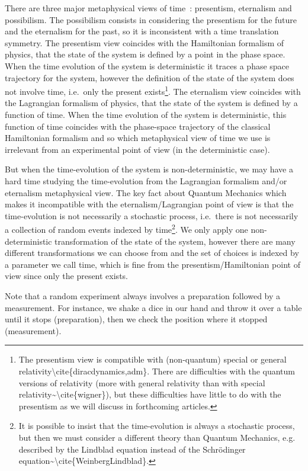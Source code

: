 \documentclass[11pt]{book}
\begin{document}
There are three major metaphysical views of
time~\cite{Savitt2017Being}:
presentism, eternalism and possibilism. The possibilism consists in
considering the presentism for the future and the eternalism for the
past, so it is inconsistent with a time translation symmetry. The
presentism view coincides with the Hamiltonian formalism of physics,
that the state of the system is defined by a point in the phase space.
When the time evolution of the system is deterministic it traces a phase
space trajectory for the system, however the definition of the state of
the system does not involve time, i.e.~only the present
exists\footnote{The presentism view is compatible with (non-quantum)
  special or general relativity\textbackslash cite\{diracdynamics,adm\}.
  There are difficulties with the quantum versions of relativity (more
  with general relativity than with special
  relativity\textasciitilde\textbackslash cite\{wigner\}), but these
  difficulties have little to do with the presentism as we will discuss
  in forthcoming articles.}. The eternalism view coincides with the
Lagrangian formalism of physics, that the state of the system is defined
by a function of time. When the time evolution of the system is
deterministic, this function of time coincides with the phase-space
trajectory of the classical Hamiltonian formalism and so which
metaphysical view of time we use is irrelevant from an experimental
point of view (in the deterministic case).

But when the time-evolution of the system is non-deterministic, we may
have a hard time studying the time-evolution from the Lagrangian
formalism and/or eternalism metaphysical view. The key fact about
Quantum Mechanics which makes it incompatible with the
eternalism/Lagrangian point of view is that the time-evolution is not
necessarily a stochastic process, i.e.~there is not necessarily a
collection of random events indexed by time\footnote{It is possible to
  insist that the time-evolution is always a stochastic process, but
  then we must consider a different theory than Quantum Mechanics, e.g.
  described by the Lindblad equation instead of the Schrödinger
  equation\textasciitilde\textbackslash cite\{WeinbergLindblad\}.}. We
only apply one non-deterministic transformation of the state of the
system, however there are many different transformations we can choose
from and the set of choices is indexed by a parameter we call time,
which is fine from the presentism/Hamiltonian point of view since only
the present exists.

Note that a random experiment always involves a preparation followed by
a measurement. For instance, we shake a dice in our hand and throw it
over a table until it stops (preparation), then we check the position
where it stopped (measurement).
\end{document}
